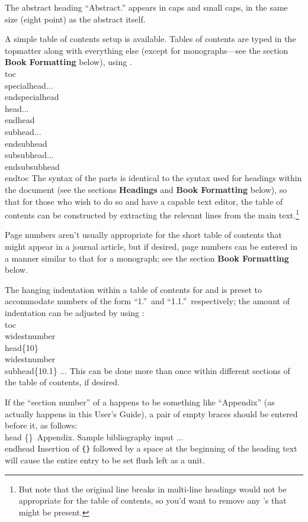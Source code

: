 The abstract heading ``{\eightpoint\smc Abstract.}'' appears in caps
and small caps, in the same size (eight point) as the abstract itself.

A simple table of contents setup is available.  Tables of contents
are typed in the topmatter along with everything else (except for
monographs---see the section {\bf Book Formatting} below), using
.
\beginexample{}
\\toc
\\specialhead...\\endspecialhead
\\head...\\endhead
\\subhead...\\endsubhead
\\subsubhead...\\endsubsubhead
\\endtoc
\endexample
\noindent
The syntax of the parts is identical to the syntax used
for headings within the document (see the sections {\bf Headings} and
{\bf Book Formatting} below), so that for those who wish to do so
and have a capable text editor, the table of contents can be constructed
by extracting the relevant lines from the main text.\footnote{But note that
the original line breaks in multi-line headings would not be appropriate
for the table of contents, so you'd want to remove any \cs{\\}'s that
might be present.}

Page numbers aren't usually appropriate for the short table of contents
that might appear in a journal article, but if desired, page numbers can
be entered in a manner similar to that for a monograph; see the section
{\bf Book Formatting} below.

The hanging indentation within a table of contents for  and
 is preset to accommodate numbers of the form
``1.''\ and ``1.1.''\ respectively; the amount of indentation can
be adjusted by using :
\beginexample{}
\\toc
\\widestnumber\\head\{10\}
\\widestnumber\\subhead\{10.1\}
...
\endexample
\noindent This can be done more than once within different sections of
the table of contents, if desired.

If the ``section number'' of a  happens to be something like
``Appendix'' (as actually happens in this User's Guide), a pair
of empty braces should be entered before it, as follows:
\beginexample{}
\\head \{\}\ Appendix. Sample bibliography input ...\\endhead
\endexample
\noindent
Insertion of {\tt\{\}} followed by a space at the beginning of the heading
text will cause the entire entry to be set flush left as a unit.

